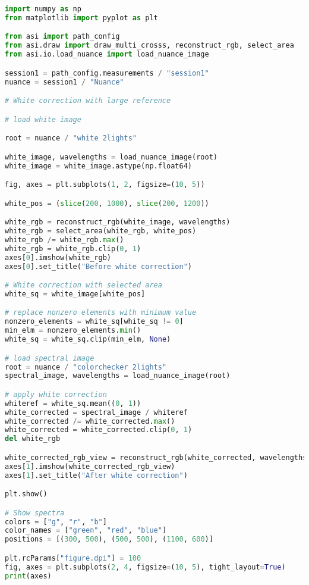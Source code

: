 \begin{lstlisting}[language=python, caption=White correction for Nuance Cmaera with large reference, label={code:wc-nuance-large}]
import numpy as np
from matplotlib import pyplot as plt

from asi import path_config
from asi.draw import draw_multi_crosss, reconstruct_rgb, select_area
from asi.io.load_nuance import load_nuance_image

session1 = path_config.measurements / "session1"
nuance = session1 / "Nuance"

# White correction with large reference

# load white image

root = nuance / "white 2lights"

white_image, wavelengths = load_nuance_image(root)
white_image = white_image.astype(np.float64)

fig, axes = plt.subplots(1, 2, figsize=(10, 5))

white_pos = (slice(200, 1000), slice(200, 1200))

white_rgb = reconstruct_rgb(white_image, wavelengths)
white_rgb = select_area(white_rgb, white_pos)
white_rgb /= white_rgb.max()
white_rgb = white_rgb.clip(0, 1)
axes[0].imshow(white_rgb)
axes[0].set_title("Before white correction")

# White correction with selected area
white_sq = white_image[white_pos]

# replace nonzero elements with minimum value
nonzero_elements = white_sq[white_sq != 0]
min_elm = nonzero_elements.min()
white_sq = white_sq.clip(min_elm, None)

# load spectral image
root = nuance / "colorchecker 2lights"
spectral_image, wavelengths = load_nuance_image(root)

# apply white correction
whiteref = white_sq.mean((0, 1))
white_corrected = spectral_image / whiteref
white_corrected /= white_corrected.max()
white_corrected = white_corrected.clip(0, 1)
del white_rgb

white_corrected_rgb_view = reconstruct_rgb(white_corrected, wavelengths)
axes[1].imshow(white_corrected_rgb_view)
axes[1].set_title("After white correction")

plt.show()

# Show spectra
colors = ["g", "r", "b"]
color_names = ["green", "red", "blue"]
positions = [(300, 500), (500, 500), (1100, 600)]

plt.rcParams["figure.dpi"] = 100
fig, axes = plt.subplots(2, 4, figsize=(10, 5), tight_layout=True)
print(axes)


\end{lstlisting}
